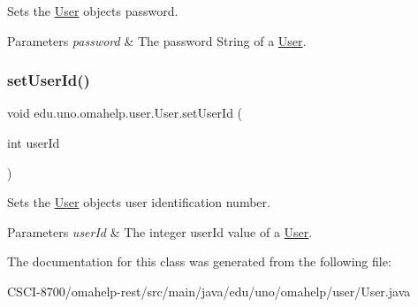 Sets the \mbox{\hyperlink{classedu_1_1uno_1_1omahelp_1_1user_1_1_user}{User}} object\textquotesingle{}s password.


\begin{DoxyParams}{Parameters}
{\em password} & The password String of a \mbox{\hyperlink{classedu_1_1uno_1_1omahelp_1_1user_1_1_user}{User}}. \\
\hline
\end{DoxyParams}
\mbox{\label{classedu_1_1uno_1_1omahelp_1_1user_1_1_user_a0ac21640eb5a16a2ea50f37e7e07d025}} 
\subsubsection{\texorpdfstring{set\+User\+Id()}{setUserId()}}
{\footnotesize\ttfamily void edu.\+uno.\+omahelp.\+user.\+User.\+set\+User\+Id (\begin{DoxyParamCaption}\item[{int}]{user\+Id }\end{DoxyParamCaption})}

Sets the \mbox{\hyperlink{classedu_1_1uno_1_1omahelp_1_1user_1_1_user}{User}} object\textquotesingle{}s user identification number.


\begin{DoxyParams}{Parameters}
{\em user\+Id} & The integer user\+Id value of a \mbox{\hyperlink{classedu_1_1uno_1_1omahelp_1_1user_1_1_user}{User}}. \\
\hline
\end{DoxyParams}


The documentation for this class was generated from the following file\+:\begin{DoxyCompactItemize}
\item 
C\+S\+C\+I-\/8700/omahelp-\/rest/src/main/java/edu/uno/omahelp/user/User.\+java\end{DoxyCompactItemize}
